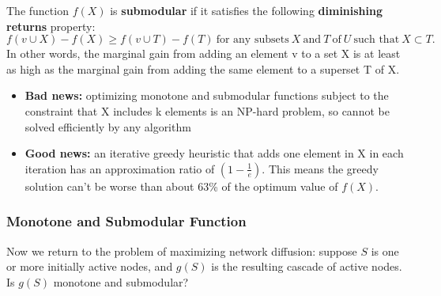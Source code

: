 \documentclass[11pt]{scrartcl} %
\begin{document}
The function $f(X)$ is \textbf{submodular} if it satisfies the following \textbf{diminishing returns} property:
\[f(v \cup X) - f(X) \geq f(v \cup T) -f(T) ~\mbox{for any subsets}~ X ~\mbox{and}~ T ~\mbox{of}~ U ~\mbox{such that}~ X \subset T.\]
In other words, the marginal gain from adding an element v to a set X is at least as high as the marginal gain from adding the same element to a superset T of X.

\begin{itemize}
	\item \textbf{Bad news:} optimizing monotone and submodular functions subject to the constraint that X includes k elements is an NP-hard problem, so cannot be solved efficiently by any algorithm
	\item \textbf{Good news:} an iterative greedy heuristic that adds one element in X in each iteration has an approximation ratio of $(1-\frac{1}{e})$. This means the greedy solution can't be worse than about 63\% of the optimum value of $f(X)$. 
\end{itemize}


\subsubsection{Monotone and Submodular Function}
Now we return to the problem of maximizing network diffusion: suppose $S$ is one or more initially active nodes, and $g(S)$ is the resulting cascade of active nodes. Is $g(S)$ monotone and submodular?
\end{document}
